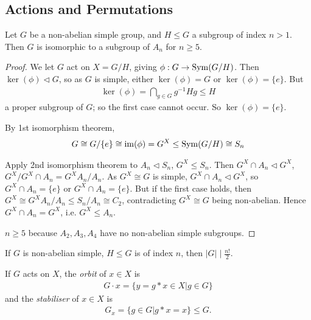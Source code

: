 \documentclass[a4paper]{article}
\begin{document}
\subsection{Actions and Permutations}

\begin{thm}
Let $G$ be a non-abelian simple group, and $H \leq G$ a subgroup of index $n>1$. Then $G$ is isomorphic to a subgroup of $A_n$ for $n \geq 5$.
\begin{proof}
We let $G$ act on $X=G/H$, giving $\phi:G \to \operatorname{Sym}(G/H)$. Then $\ker(\phi) \triangleleft G$, so as $G$ is simple, either $\ker(\phi) = G$ or $\ker(\phi) = \{e\}$. But
\begin{equation*}
\begin{aligned}
\ker(\phi) = \bigcap_{g \in G} g^{-1}Hg \leq H
\end{aligned}
\end{equation*}
a proper subgroup of $G$; so the first case cannot occur. So $\ker(\phi) = \{e\}$.

By 1st isomorphism theorem,
\begin{equation*}
\begin{aligned}
G \cong G/\{e\} \cong \operatorname{im}(\phi) = G^X \leq \operatorname{Sym}(G/H) \cong S_n
\end{aligned}
\end{equation*}

Apply 2nd isomorphism theorem to $A_n \triangleleft S_n$, $G^X \leq S_n$. Then $G^X \cap A_n \triangleleft G^X$, $G^X/G^X\cap A_n = G^X A_n / A_n$.
As $G^X \cong G$ is simple, $G^X \cap A_n \triangleleft G^X$, so $G^X \cap A_n = \{e\}$ or $G^X \cap A_n = \{e\}$. But if the first case holds, then $G^X \cong G^XA_n/A_n \leq S_n / A_n \cong C_2$, contradicting $G^X \cong G$ being non-abelian. Hence $G^X \cap A_n = G^X$, i.e. $G^X \leq A_n$.

$n \geq 5$ because $A_2,A_3,A_4$ have no non-abelian simple subgroups.
\end{proof}
\end{thm}

\begin{coro}
If $G$ is non-abelian simple, $H \leq G$ is of index $n$, then $|G| \mid \frac{n!}{2}$.
\end{coro}

\begin{defi}
If $G$ acts on $X$, the \emph{orbit} of $x \in X$ is
\begin{equation*}
\begin{aligned}
G \cdot x = \{ y=g*x \in X| g \in G\}
\end{aligned}
\end{equation*}
and the \emph{stabiliser} of $x \in X$ is
\begin{equation*}
\begin{aligned}
G_x = \{g\in G|g*x = x\} \leq G.
\end{aligned}
\end{equation*}
\end{defi}
\end{document}
